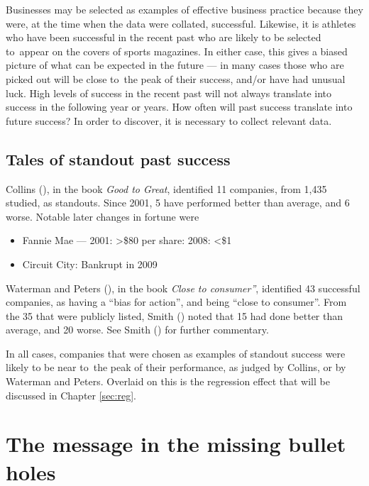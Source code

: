 \documentclass[
  10ptls,
  b5paper]{book}
\providecommand{\tightlist}{%
  \setlength{\itemsep}{0pt}\setlength{\parskip}{0pt}}
\begin{document}
Businesses may be selected as examples of effective business
practice because they were, at the time when the data were
collated, successful. Likewise, it is athletes who have
been successful in the recent past who are likely to be
selected to~appear on the covers of sports magazines.
In either case, this gives a biased picture of what can be
expected in the future --- in many cases those who are
picked out will be close to~the peak of their success,
and/or have had unusual luck. High levels of success in
the recent past will not always translate into success
in the following year or years. How often will past
success translate into future success? In order to
discover, it is necessary to collect relevant data.

\subsection*{Tales of standout past success}\label{tales-of-standout-past-success}

Collins (), in the book \emph{Good to Great}, identified
11 companies, from 1,435 studied, as standouts. Since 2001,
5 have performed better than average, and 6 worse.
Notable later changes in fortune were

\begin{itemize}
\tightlist
\item
  Fannie Mae --- 2001: \textgreater\$80 per share: 2008: \textless\$1
\item
  Circuit City: Bankrupt in 2009
\end{itemize}

Waterman and Peters (), in the book \emph{Close to consumer''},
identified 43 successful companies, as having a ``bias for action'',
and being ``close to consumer''. From the 35 that were publicly listed,
Smith () noted that 15 had done better than average, and 20 worse.
See Smith () for further commentary.

In all cases, companies that were chosen as examples of
standout success were likely to be near to~the peak of
their performance, as judged by Collins, or by Waterman and Peters.
Overlaid on this is the regression effect that will be discussed
in Chapter \ref{sec:reg}.

\section{The message in the missing bullet holes}\label{ss:wald}
\end{document}
